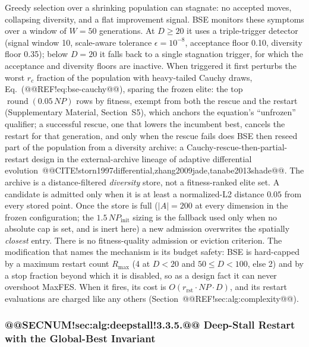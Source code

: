 \documentclass[10pt,a4paper]{article}
\begin{document}
Greedy selection over a shrinking population can stagnate: no
accepted moves, collapsing diversity, and a flat improvement signal.
BSE monitors these symptoms over a window of $W=50$ generations. At
$D\ge20$ it uses a triple-trigger detector (signal window 10,
scale-aware tolerance $\epsilon=10^{-8}$, acceptance floor 0.10,
diversity floor 0.35); below $D=20$ it falls back to a single
stagnation trigger, for which the acceptance and diversity floors are
inactive. When triggered it first perturbs the
worst $r_{c}$ fraction of the population with heavy-tailed
Cauchy draws, Eq.~(@@REF!eq:bse-cauchy@@), sparing the frozen elite:
the top $\operatorname{round}(0.05\,NP)$ rows by fitness, exempt from
both the rescue and the restart (Supplementary Material, Section~S5),
which anchors the equation's ``unfrozen'' qualifier; a successful rescue, one that
lowers the incumbent best, cancels the restart for that generation, and
only when the rescue fails does BSE then reseed part of the population from
a diversity archive: a Cauchy-rescue-then-partial-restart design in the
external-archive lineage of adaptive differential
evolution~@@CITE!storn1997differential,zhang2009jade,tanabe2013shade@@. 
The archive is a distance-filtered \emph{diversity} store, not a
fitness-ranked elite set. A candidate is admitted only when it is at
least a normalized-L2 distance $0.05$ from every stored point. Once
the store is full ($|A| = 200$ at every dimension in the frozen configuration; the $1.5\,NP_{\text{init}}$ sizing is the fallback used only when no absolute cap is set, and is inert here)
a new admission overwrites the spatially \emph{closest} entry. There is no
fitness-quality admission or eviction criterion. 
The modification that names the mechanism is its budget safety: BSE is
hard-capped by a maximum restart count $R_{\max}$ (4 at $D{<}20$ and
$50{\le}D{<}100$, else 2) and by a stop fraction beyond which it is disabled, so as a
design fact it can never overshoot
MaxFES. 
When it fires, its cost is $O(r_{\text{rst}}\cdot NP\cdot D)$, and its
restart evaluations are charged like any others
(Section~@@REF!sec:alg:complexity@@). 

\subsubsection{@@SECNUM!sec:alg:deepstall!3.3.5.@@ Deep-Stall Restart with the Global-Best Invariant}\label{sec:alg:deepstall}
\end{document}
